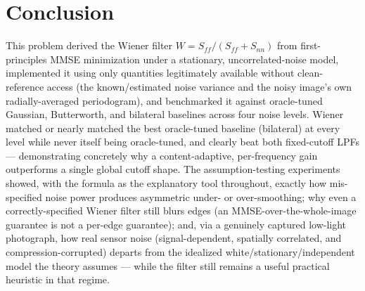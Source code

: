 \documentclass[11pt]{article}
\begin{document}
\section{Conclusion}

This problem derived the Wiener filter $W=S_{ff}/(S_{ff}+S_{nn})$ from first-principles MMSE
minimization under a stationary, uncorrelated-noise model, implemented it using only
quantities legitimately available without clean-reference access (the known/estimated noise
variance and the noisy image's own radially-averaged periodogram), and benchmarked it against
oracle-tuned Gaussian, Butterworth, and bilateral baselines across four noise levels. Wiener
matched or nearly matched the best oracle-tuned baseline (bilateral) at every level while never
itself being oracle-tuned, and clearly beat both fixed-cutoff LPFs — demonstrating concretely
why a content-adaptive, per-frequency gain outperforms a single global cutoff shape. The
assumption-testing experiments showed, with the formula as the explanatory tool throughout,
exactly how mis-specified noise power produces asymmetric under- or over-smoothing; why even a
correctly-specified Wiener filter still blurs edges (an MMSE-over-the-whole-image guarantee is
not a per-edge guarantee); and, via a genuinely captured low-light photograph, how real sensor
noise (signal-dependent, spatially correlated, and compression-corrupted) departs from the
idealized white/stationary/independent model the theory assumes — while the filter still
remains a useful practical heuristic in that regime.
\end{document}
